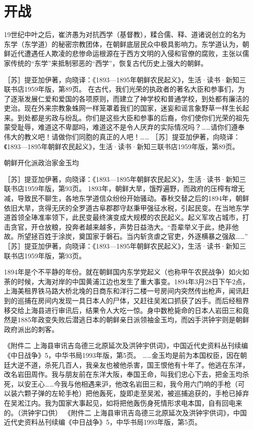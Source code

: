 \documentclass[12pt,UTF8]{ctexbook}
\begin{document}
\section{开战}

19世纪中叶之后，崔济愚为对抗西学（基督教），糅合儒、释、道诸说创立的名为东学（东学道）的秘密宗教团体，在朝鲜底层民众中极具影响力。东学道认为，朝鲜近代遭遇任人欺凌的悲惨命运根源在于西方文明的入侵和官僚的腐败，主张以儒家传统的“东学”来抵制邪恶的“西学”，恢复古代历史上强大的朝鲜。

［苏］提亚加伊著，向晓译：《1893—1895年朝鲜农民起义》，生活·读书·新知三联书店1959年版，第89页。
在古代，我们光荣的执政者的著名大臣和参事们，为了逐渐发展仁爱和爱国的各项原则，而建立了神学校和普通学校，到处都有廉洁的吏治。现在外来宗教象蛛网一样笼罩着我们的国家，迷妄和谣言象野草一样生长起来。到处都是劣政与纷乱。你们是这些大臣和参事的后裔，你们使你们光荣的祖先蒙受耻辱，难道这不卑鄙吗，难道这不是令人厌弃的实际情况吗？……请你们遵奉伟大的教义吧！请做你们同胞的真正的人吧！…… ［苏］提亚加伊著，向晓译：《1893—1895年朝鲜农民起义》，生活·读书·新知三联书店1959年版，第89页。


朝鲜开化派政治家金玉均

［苏］提亚加伊著，向晓译：《1893—1895年朝鲜农民起义》，生活·读书·新知三联书店1959年版，第93页。
1893年，朝鲜大旱，饿殍遍野，而政府的压榨有增无减，导致民不聊生，各地东学道信众纷纷开始骚动。春秋交替之后的1894年，朝鲜依旧大旱，贪得无厌的全罗道古阜郡郡守赵秉甲强征水税，引起民变。在当地东学道首领全琫准率领下，此民变最终演变成大规模的农民起义。起义军攻占城市，打击贪官，开仓放粮，投奔者越来越多，声势日益浩大。“吾辈举义于此，绝非他故。所望拯百姓于涂炭，奠国家于磐石。当内斩贪虐之官吏，外逐横暴之强敌……” ［苏］提亚加伊著，向晓译：《1893—1895年朝鲜农民起义》，生活·读书·新知三联书店1959年版，第93页。

1894年是个不平静的年份。就在朝鲜国内东学党起义（也称甲午农民战争）如火如荼的时候，大海对岸的中国黄浦江边也发生了重大事变。1894年3月28日下午2点，上海美租界铁马路大桥北堍的日商东和洋行二楼一号房间内突然传出枪声，闻讯赶到的巡捕在房间内发现一具日本人的尸体，又赶往吴淞口抓获了凶手。而后经租界移交给上海县进行审讯后，结果令人大吃一惊。身中数枪毙命的日本人岩田三和竟然是1885年政变失败后潜逃日本的朝鲜亲日派领袖金玉均，而凶手洪钟宇则是朝鲜政府派出的刺客。

《附件二 上海县审讯吉岛德三北原延次及洪钟宇供词》，中国近代史资料丛刊续编《中日战争》5，中华书局1993年版，第5页。
……金玉均是前为本国权臣，因在朝廷大逆不道，杀死几百人，我亲友也被他杀害，国王恨他有十年了。他逃在东洋，改名岩田周作。我与朋友前在东洋大阪，奉国王命，叫我们忠心下去，把金玉均杀死，以安王心……今我与他相遇来沪，他改名岩田三和，我今用六门响的手枪（可以装六颗子弹的左轮手枪）把他轰死，旋即走至吴淞，被巡捕追获的，手枪已掉弃在吴淞江内。我为国家大事起见，如将把他轰伤身死情形求电本国，自有回电来的。（洪钟宇口供） 《附件二 上海县审讯吉岛德三北原延次及洪钟宇供词》，中国近代史资料丛刊续编《中日战争》5，中华书局1993年版，第5页。
\end{document}
